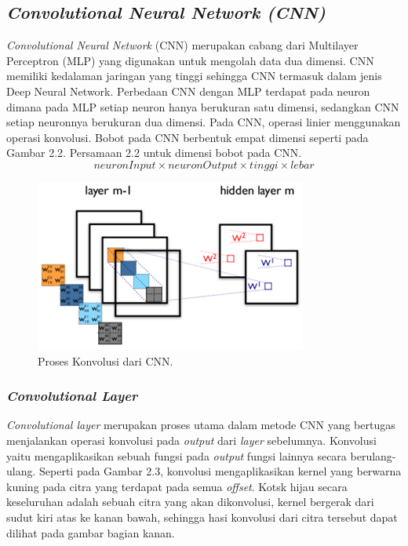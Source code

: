 \subsection{\emph{Convolutional Neural Network (CNN)}}
\label{sec:cnn}
\emph{Convolutional Neural Network} (CNN) merupakan cabang dari Multilayer Perceptron
(MLP) yang digunakan untuk mengolah data dua dimensi. CNN memiliki kedalaman
jaringan yang tinggi sehingga CNN termasuk dalam jenis Deep Neural Network. Perbedaan
CNN dengan MLP terdapat pada neuron dimana pada MLP setiap neuron hanya berukuran
satu dimensi, sedangkan CNN setiap neuronnya berukuran dua dimensi. Pada CNN, operasi
linier menggunakan operasi konvolusi. Bobot pada CNN berbentuk empat dimensi seperti pada Gambar 2.2. Persamaan 2.2 untuk dimensi
bobot pada CNN.
\begin{equation}
  neuron  Input \times neuron  Output \times tinggi \times lebar
\end{equation}

\begin{figure}[ht]
  \centering

  \includegraphics[scale=0.8]{gambar/proses konvolusi.png}

  \caption{Proses Konvolusi dari CNN.}
  \label{fig:convolutional-neural-network}
\end{figure}

\subsubsection{\emph{Convolutional Layer}}
\label{subsec:convolutional-layer}
\emph{Convolutional layer} merupakan proses utama dalam metode CNN yang bertugas menjalankan operasi konvolusi pada \emph{output} dari \emph{layer} sebelumnya. 
Konvolusi yaitu mengaplikasikan sebuah fungsi pada \emph{output} fungsi lainnya secara berulang-ulang. Seperti pada Gambar 2.3, konvolusi
mengaplikasikan kernel yang berwarna kuning pada citra yang terdapat pada semua \emph{offset}. Kotsk hijau secara keseluruhan adalah sebuah citra yang
akan dikonvolusi, kernel bergerak dari sudut kiri atas ke kanan bawah, sehingga hasi konvolusi dari citra tersebut dapat dilihat pada gambar bagian kanan.

